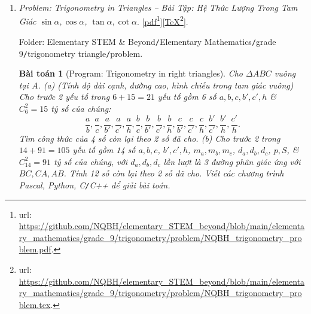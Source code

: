 \documentclass[12pt,twoside]{book}
\newtheorem{baitoan}{Bài toán}
\begin{document}
\begin{enumerate}
	Folder: {\sf Elementary STEM \& Beyond{\tt/}Elementary Mathematics{\tt/}grade 9{\tt/}root{\tt/}problem}.
	\begin{itemize}
		\item {\it Problem \& Solution: Root $\sqrt{f(x)},\sqrt[3]{f(x)},\sqrt[n]{f(x)}$ -- Bài Tập \& Lời Giải: Căn Thức $\sqrt{f(x)},\sqrt[3]{f(x)}$, $\sqrt[n]{f(x)}$}. [\href{https://github.com/NQBH/elementary_STEM_beyond/blob/main/elementary_mathematics/grade_9/root/solution/NQBH_root_solution.pdf}{pdf}\footnote{{\sc url}: \url{https://github.com/NQBH/elementary_STEM_beyond/blob/main/elementary_mathematics/grade_9/root/solution/NQBH_root_solution.pdf}.}][\href{https://github.com/NQBH/elementary_STEM_beyond/blob/main/elementary_mathematics/grade_9/root/solution/NQBH_root_solution.tex}{\TeX}\footnote{{\sc url}: \url{https://github.com/NQBH/elementary_STEM_beyond/blob/main/elementary_mathematics/grade_9/root/solution/NQBH_root_solution.tex}.}].
		
		Folder: {\sf Elementary STEM \& Beyond{\tt/}Elementary Mathematics{\tt/}grade 9{\tt/}root{\tt/}solution}.
	\end{itemize}	
	\item {\it Problem: Trigonometry in Triangles -- Bài Tập: Hệ Thức Lượng Trong Tam Giác $\sin\alpha,\cos\alpha$, $\tan\alpha,\cot\alpha$}. [\href{https://github.com/NQBH/elementary_STEM_beyond/blob/main/elementary_mathematics/grade_9/trigonometry/problem/NQBH_trigonometry_problem.pdf}{pdf}\footnote{{\sc url}: \url{https://github.com/NQBH/elementary_STEM_beyond/blob/main/elementary_mathematics/grade_9/trigonometry/problem/NQBH_trigonometry_problem.pdf}.}][\href{https://github.com/NQBH/elementary_STEM_beyond/blob/main/elementary_mathematics/grade_9/trigonometry/problem/NQBH_trigonometry_problem.tex}{\TeX}\footnote{{\sc url}: \url{https://github.com/NQBH/elementary_STEM_beyond/blob/main/elementary_mathematics/grade_9/trigonometry/problem/NQBH_trigonometry_problem.tex}.}].
	
	Folder: {\sf Elementary STEM \& Beyond{\tt/}Elementary Mathematics{\tt/}grade 9{\tt/}trigonometry triangle{\tt/}problem}.
	
	\begin{baitoan}[{\sf Program}: Trigonometry in right triangles]
		Cho $\Delta ABC$ vuông tại $A$. (a) {\rm(Tính độ dài cạnh, đường cao, hình chiếu trong tam giác vuông)} Cho trước 2 yếu tố trong $6 + 15 = 21$ yếu tố gồm 6 số $a,b,c,b',c',h$ \& $C_6^2 = 15$ tỷ số của chúng:
		\begin{equation*}
			\frac{a}{b},\frac{a}{c},\frac{a}{b'},\frac{a}{c'},\frac{a}{h},\frac{b}{c},\frac{b}{b'},\frac{b}{c'},\frac{b}{h},\frac{c}{b'},\frac{c}{c'},\frac{c}{h},\frac{b'}{c'},\frac{b'}{h},\frac{c'}{h}.
		\end{equation*}
		Tìm công thức của 4 số còn lại theo 2 số đã cho. (b) Cho trước 2 trong $14 + 91 = 105$ yếu tố gồm 14 số $a,b,c$, $b',c',h$, $m_a,m_b,m_c$, $d_a,d_b,d_c$, $p,S$, \& $C_{14}^2 = 91$ tỷ số của chúng, với $d_a,d_b,d_c$ lần lượt là 3 đường phân giác ứng với $BC,CA,AB$. Tính 12 số còn lại theo 2 số đã cho. Viết các chương trình {\sf Pascal, Python, C{\tt/}C++} để giải bài toán.
	\end{baitoan}
	

\end{enumerate}
\end{document}
